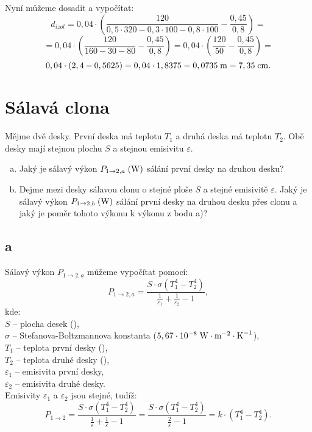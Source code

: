 \documentclass{article}
\begin{document}
Nyní můžeme dosadit a vypočítat:
$$
    d_{izol} = 0,04 \cdot \left( \frac{120}{0,5 \cdot 320 - 0,3 \cdot 100 - 0,8 \cdot 100} - \frac{0,45}{0,8} \right) =
$$
$$
    = 0,04 \cdot \left( \frac{120}{160 - 30 - 80} - \frac{0,45}{0,8} \right) = 0,04 \cdot \left( \frac{120}{50} - \frac{0,45}{0,8} \right) =
$$
$$
    0,04 \cdot (2,4 - 0,5625) = 0,04 \cdot 1,8375 = 0,0735 \; \textrm{m} = 7,35 \; \textrm{cm}.
$$

\newpage




\section{ Sálavá clona \spicy \spicy}
Mějme dvě desky. První deska má teplotu $T_1$ a druhá deska má teplotu $T_2$. Obě desky mají stejnou plochu $S$ a stejnou emisivitu $\varepsilon$.
\begin{enumerate}[a)]
    \item Jaký je sálavý výkon $P_{1 \rightarrow 2,a} \; (\textrm{W})$ sálání první desky na druhou desku?
    \item Dejme mezi desky sálavou clonu o stejné ploše $S$ a stejné emisivitě $\varepsilon$. Jaký je sálavý výkon $P_{1 \rightarrow 2,b} \; (\textrm{W})$ sálání první desky na druhou desku přes clonu a jaký je poměr tohoto výkonu k výkonu z bodu a)?
\end{enumerate}



\subsection{a}
Sálavý výkon $P_{1 \rightarrow 2,a}$ můžeme vypočítat pomocí:
$$
    P_{1 \rightarrow 2,a} = \frac{S \cdot \sigma \left( T_1^4 - T_2^4 \right)}{\frac{1}{\varepsilon_1} + \frac{1}{\varepsilon_2} - 1},
$$
kde:\\
$S$ -- plocha desek (\ueqMsq),\\
$\sigma$ -- Stefanova-Boltzmannova konstanta ($5,67 \cdot 10^{-8} \; \textrm{W} \cdot \textrm{m}^{-2} \cdot \textrm{K}^{-1}$),\\
$T_1$ -- teplota první desky (\uK),\\
$T_2$ -- teplota druhé desky (\uK),\\
$\varepsilon_1$ -- emisivita první desky,\\
$\varepsilon_2$ -- emisivita druhé desky.\\

Emisivity $\varepsilon_1$ a $\varepsilon_2$ jsou stejné, tudíž:
$$
    P_{1 \rightarrow 2} = \frac{S \cdot \sigma \left( T_1^4 - T_2^4 \right)}{\frac{1}{\varepsilon} + \frac{1}{\varepsilon} - 1} = \frac{S \cdot \sigma \left( T_1^4 - T_2^4 \right)}{\frac{2}{\varepsilon} - 1} = k \cdot \left( T_1^4 - T_2^4 \right).
$$
\end{document}
